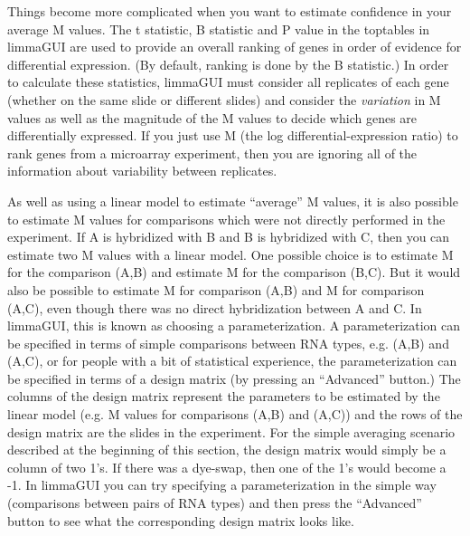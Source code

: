 \documentclass[a4paper,11pt]{article}
\begin{document}
Things become more complicated when you want to estimate confidence in your average M values.  The t statistic, 
B statistic and P value in the toptables in limmaGUI are used to provide an overall ranking of genes in order 
of evidence for differential expression.  (By default, ranking is done by the B statistic.)  In order to 
calculate these statistics, limmaGUI must consider all replicates of each gene (whether on the same slide or 
different slides) and consider the \emph{variation} in M values as well as the magnitude of the M values to 
decide which genes are differentially expressed.  If you just use M (the log differential-expression ratio) 
to rank genes from a microarray experiment, then you are ignoring all of the information about variability 
between replicates.

As well as using a linear model to estimate ``average'' M values, it is also possible to estimate M values for 
comparisons which were not directly performed in the experiment.  If A is hybridized with B and
B is hybridized with C, then you can estimate two M values with a linear model.  One possible choice is to
estimate M for the comparison (A,B) and estimate M for the comparison (B,C).  But it would also be possible
to estimate M for comparison (A,B) and M for comparison (A,C), even though there was no direct hybridization
between A and C.  In limmaGUI, this is known as choosing a parameterization.  A parameterization can be
specified in terms of simple comparisons between RNA types, e.g. (A,B) and (A,C), or for people with a bit of
statistical experience, the parameterization can be specified in terms of a design matrix (by pressing an
``Advanced'' button.)  The columns of the design matrix represent the parameters to be estimated by the 
linear model (e.g. M values for comparisons (A,B) and (A,C)) and
the rows of the design matrix are the slides in the experiment.  For the simple averaging scenario described
at the beginning of this section, the design matrix would simply be a column of two 1's.  If there was a
dye-swap, then one of the 1's would become a -1.  In limmaGUI you can try specifying a parameterization in the 
simple way (comparisons between pairs of RNA types) and then press the ``Advanced'' button to see what the
corresponding design matrix looks like.
\end{document}
